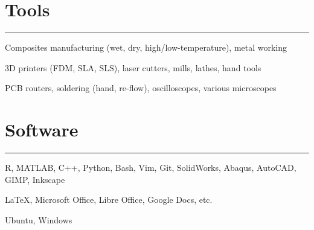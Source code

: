 \vfill
\section{Tools}

\noindent\rule{\textwidth}{\hlinewidth}
    \begin{innerlist}
    \item Composites manufacturing (wet, dry, high/low-temperature), metal working
    \item 3D printers (FDM, SLA, SLS), laser cutters, mills, lathes, hand tools
    \item PCB routers, soldering (hand, re-flow), oscilloscopes, various microscopes
    \end{innerlist}
\vfill
\section{Software}

\noindent\rule{\textwidth}{\hlinewidth}
    \begin{innerlist}
        \item R, MATLAB, C++, Python, Bash, Vim, Git, SolidWorks, Abaqus, AutoCAD, GIMP, Inkscape
        \item \LaTeX, Microsoft Office, Libre Office, Google Docs, etc.
	\item Ubuntu, Windows
    \end{innerlist}
\vfill
